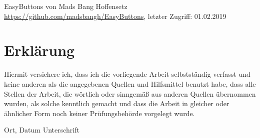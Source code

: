 EasyButtons von Mads Bang Hoffensetz
\newblock \url{https://github.com/madsbangh/EasyButtons},
\newblock letzter Zugriff: 01.02.2019

\label{m.tuer}




\chapter*{Erklärung}

Hiermit versichere ich, dass ich die vorliegende Arbeit selbstständig verfasst und keine anderen als die angegebenen Quellen und Hilfsmittel benutzt habe, dass alle Stellen der Arbeit, die wörtlich oder sinngemäß aus anderen Quellen übernommen wurden, als solche kenntlich gemacht und dass die Arbeit in gleicher oder ähnlicher Form noch keiner Prüfungsbehörde vorgelegt wurde.

\vspace{3cm}
Ort, Datum \hspace{5cm} Unterschrift \\

